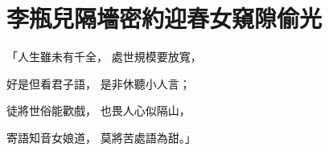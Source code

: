 %

\chapter{李瓶兒隔墻密約\KG 迎春女窺隙偷光}

\begin{showcontents}{}



「人生雖未有千全，  處世規模要放寬，

好是但看君子語，  是非休聽小人言；

徒將世俗能歡戲，  也畏人心似隔山，

寄語知音女娘道，  莫將苦處語為甜。」


\end{showcontents}
